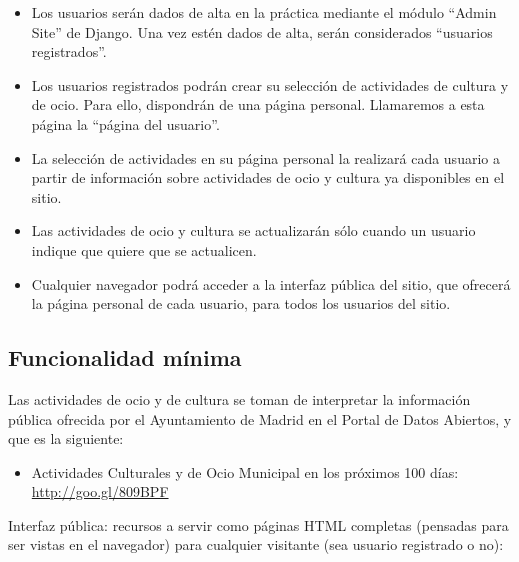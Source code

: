 \begin{itemize}
\item Los usuarios serán dados de alta en la práctica mediante el módulo ``Admin Site'' de Django. Una vez estén dados de alta, serán considerados ``usuarios registrados''.

\item Los usuarios registrados podrán crear su selección de actividades de cultura y de ocio. Para ello, dispondrán de una página personal. Llamaremos a esta página la ``página del usuario''.

\item La selección de actividades en su página personal la realizará cada usuario a partir de información sobre actividades de ocio y cultura ya disponibles en el sitio.

\item Las actividades de ocio y cultura se actualizarán sólo cuando un usuario indique que quiere que se actualicen.

\item Cualquier navegador podrá acceder a la interfaz pública del sitio, que ofrecerá la página personal de cada usuario, para todos los usuarios del sitio.

\end{itemize}


\subsection{Funcionalidad mínima}

Las actividades de ocio y de cultura se toman de interpretar la información pública ofrecida por el Ayuntamiento de Madrid en el Portal de Datos Abiertos, y que es la siguiente:
    \begin{itemize}
      \item Actividades Culturales y de Ocio Municipal en los próximos 100 días: \\
        \url{http://goo.gl/809BPF}
    \end{itemize}

Interfaz pública: recursos a servir como páginas HTML completas (pensadas para ser vistas en el navegador) para cualquier visitante (sea usuario registrado o no):

